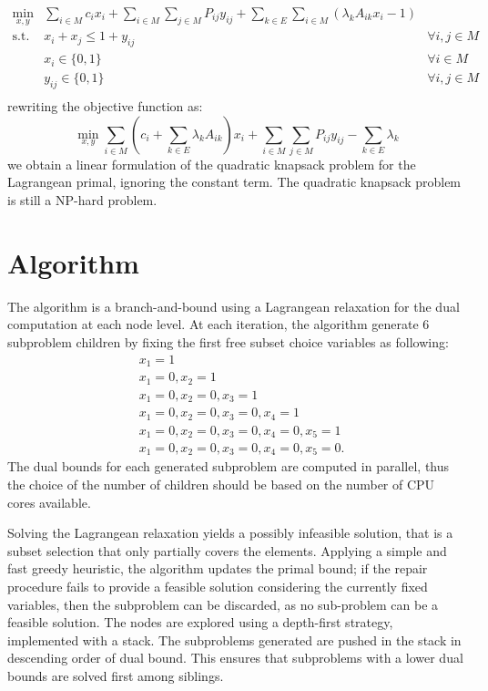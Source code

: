 \documentclass[a4paper]{article}
\begin{document}
\begin{align*}
	\min_{x,y} & \sum_{i\in M} c_i x_i + \sum_{i \in M} \sum_{j \in M} P_{ij} y_{ij} + \sum_{k \in E}\sum_{i\in M} \left(\lambda_k A_{ik} x_i - 1\right)  & \\
	\text{s.t. }
	& x_i + x_j \le 1 + y_{ij} & \forall i,j \in M \\
	& x_i \in \{0, 1\} & \forall i \in M \\
	& y_{ij} \in \{0, 1\} & \forall i,j \in M\\
\end{align*}
rewriting the objective function as:
$$
\min_{x,y} \sum_{i\in M} \left(c_i + \sum_{k \in E} \lambda_k A_{ik}\right) x_i + \sum_{i \in M} \sum_{j \in M} P_{ij} y_{ij} - \sum_{k \in E} \lambda_k
$$
we obtain a linear formulation of the quadratic knapsack problem for the Lagrangean primal, ignoring the constant term. The quadratic knapsack problem is still a NP-hard problem.

\section{Algorithm}

The algorithm is a branch-and-bound using a Lagrangean relaxation for the dual computation at each node level. At each iteration, the algorithm generate 6 subproblem children by fixing the first free subset choice variables as following:
\begin{align*}
&x_1 = 1\\
&x_1 = 0, x_2 = 1\\
&x_1 = 0, x_2 = 0, x_3 = 1\\
&x_1 = 0, x_2 = 0, x_3 = 0, x_4 = 1\\
&x_1 = 0, x_2 = 0, x_3 = 0, x_4 = 0, x_5 = 1\\
&x_1 = 0, x_2 = 0, x_3 = 0, x_4 = 0, x_5 = 0.
\end{align*}
The dual bounds for each generated subproblem are computed in parallel, thus the choice of the number of children should be based on the number of CPU cores available. 

Solving the Lagrangean relaxation yields a possibly infeasible solution, that is a subset selection that only partially covers the elements. Applying a simple and fast greedy heuristic, the algorithm updates the primal bound; if the repair procedure fails to provide a feasible solution considering the currently fixed variables, then the subproblem can be discarded, as no sub-problem can be a feasible solution.
The nodes are explored using a depth-first strategy, implemented with a stack. The subproblems generated are pushed in the stack in descending order of dual bound. This ensures that subproblems with a lower dual bounds are solved first among siblings.
\end{document}
